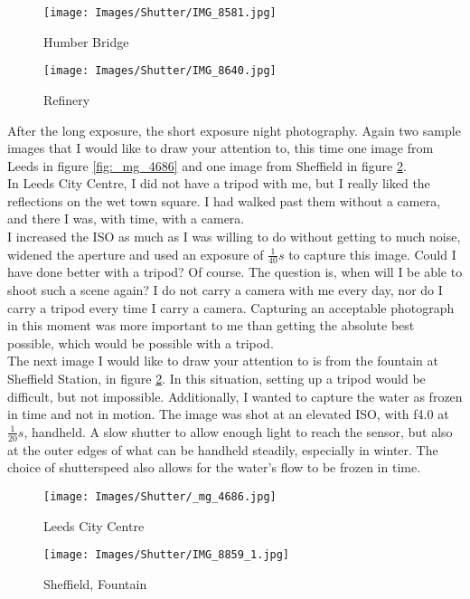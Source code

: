 \begin{figure}[htb]
\begin{minipage}{.5\textwidth}
	\centering
		\texttt{[image: Images/Shutter/IMG\_8581.jpg]}
	\caption{Humber Bridge}
	\label{fig:IMG_8581}
\end{minipage}
\begin{minipage}{.5\textwidth}
	\centering
		\texttt{[image: Images/Shutter/IMG\_8640.jpg]}
	\caption{Refinery}
	\label{fig:IMG_8640}
\end{minipage}
\end{figure}

After the long \gls{exposure}, the short \gls{exposure} night photography. Again two sample images that I would like to draw your attention to, this time one image from Leeds in figure \ref{fig:_mg_4686} and one image from Sheffield in figure \ref{fig:IMG_8859_1}.
\\[\baselineskip]
In Leeds City Centre, I did not have a tripod with me, but I really liked the reflections on the wet town square. I had walked past them without a camera, and there I was, with time, with a camera.
\\
I increased the \gls{ISO} as much as I was willing to do without getting to much noise, widened the \gls{aperture} and used an \gls{exposure} of $\frac{1}{40}s$ to capture this image. Could I have done better with a tripod? Of course. The question is, when will I be able to shoot such a scene again? I do not carry a camera with me every day, nor do I carry a tripod every time I carry a camera. Capturing an acceptable photograph in this moment was more important to me than getting the absolute best possible, which would be possible with a tripod.
\\[\baselineskip]
The next image I would like to draw your attention to is from the fountain at Sheffield Station, in figure \ref{fig:IMG_8859_1}. In this situation, setting up a tripod would be difficult, but not impossible. Additionally, I wanted to capture the water as frozen in time and not in motion. The image was shot at an elevated \gls{ISO}, with f4.0 at $\frac{1}{20}s$, handheld. A slow \gls{shutter} to allow enough light to reach the sensor, but also at the outer edges of what can be handheld steadily, especially in winter. The choice of \gls{shutterspeed} also allows for the water's flow to be frozen in time.

\begin{figure}[hthb]
\begin{minipage}{.5\textwidth}
	\centering
		\texttt{[image: Images/Shutter/\_mg\_4686.jpg]}
	\caption{Leeds City Centre}
	\label{fig:_mg_4686}
\end{minipage}
\begin{minipage}{.5\textwidth}
	\centering
		\texttt{[image: Images/Shutter/IMG\_8859\_1.jpg]}
	\caption{Sheffield, Fountain}
	\label{fig:IMG_8859_1}
\end{minipage}
\end{figure}

